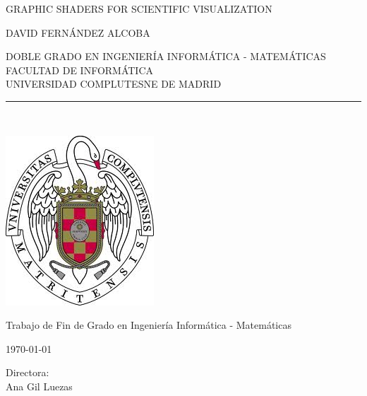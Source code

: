 
\newpage


\thispagestyle{empty}

\begin{center}

   \vspace{1cm}

   {\Large GRAPHIC SHADERS FOR SCIENTIFIC VISUALIZATION}\\

   \vspace{0.5cm}

   \vspace{0.5cm}

   {\large DAVID FERNÁNDEZ ALCOBA}\\

   \vspace{0.5cm}

   DOBLE GRADO EN INGENIERÍA INFORMÁTICA - MATEMÁTICAS\\ 
   FACULTAD DE INFORMÁTICA\\
   UNIVERSIDAD COMPLUTESNE DE MADRID \\

   \vspace{0.65cm}
   \rule{2in}{0.5pt}\\
   \vspace{1.85cm}

  \includegraphics[height=2.5in]{figures/escudo.jpg}
  
   \vspace{1.5cm}
Trabajo de Fin de Grado en Ingeniería Informática - Matemáticas

   \vspace{0.5cm}

  \today\\
   \vspace{1cm}

\end{center}

{\raggedleft
   \vspace{ 1cm}
Directora:\\
   \vspace{ 0.2cm}
Ana Gil Luezas\\
}
